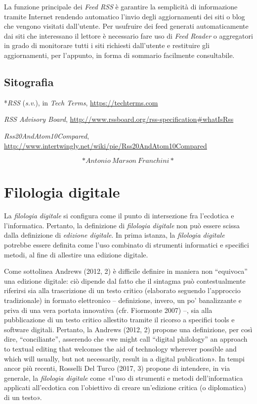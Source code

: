 \documentclass[
  b5paper,
  twoside,
  12pt,
  chapterprefix=false,
  bibliography=totocnumbered,
  parskip=false]{scrbook}
\begin{document}
La funzione principale dei \emph{Feed RSS} è garantire la semplicità di
informazione tramite Internet rendendo automatico l'invio degli
aggiornamenti dei siti o blog che vengono visitati dall'utente. Per
usufruire dei feed generati automaticamente dai siti che interessano il
lettore è necessario fare uso di \emph{Feed Reader} o aggregatori in grado di
monitorare tutti i siti richiesti dall'utente e restituire gli
aggiornamenti, per l'appunto, in forma di sommario facilmente
consultabile.

\hypertarget{sitografia-11}{%
\section*{Sitografia}\label{sitografia-11}}

*\emph{RSS} (\emph{s.v}.), in \emph{Tech Terms},
\url{https://techterms.com}

\emph{RSS Advisory Board},
\url{http://www.rssboard.org/rss-specification\#whatIsRss}

\emph{Rss20AndAtom10Compared},
\url{http://www.intertwingly.net/wiki/pie/Rss20AndAtom10Compared}

\[*Antonio~Marson~Franchini*\]

\hypertarget{filologia-digitale}{%
\chapter{Filologia digitale}\label{filologia-digitale}}

La \emph{filologia} \emph{digitale} si configura come il punto di intersezione fra
l'ecdotica e l'informatica. Pertanto, la definizione di \emph{filologia
digitale} non può essere scissa dalla definizione di \emph{edizione
digitale}. In prima istanza, la \emph{filologia digitale} potrebbe essere
definita come l'uso combinato di strumenti informatici e specifici
metodi, al fine di allestire una edizione digitale.

Come sottolinea Andrews (2012, 2) è difficile definire in maniera non
\enquote{equivoca} una edizione digitale: ciò dipende dal fatto che il sintagma
può contestualmente riferirsi sia alla trascrizione di un testo critico
(elaborato seguendo l'approccio tradizionale) in formato elettronico --
definizione, invero, un po' banalizzante e priva di una vera portata
innovativa (cfr. Fiormonte 2007) --, sia alla pubblicazione di un testo
critico allestito tramite il ricorso a specifici tools e software
digitali. Pertanto, la Andrews (2012, 2) propone una definizione, per
così dire, \enquote{conciliante}, asserendo che «we might call \enquote{digital
philology} an approach to textual editing that welcomes the aid of
technology wherever possible and which will usually, but not
necessarily, result in a digital publication». In tempi ancor più
recenti, Rosselli Del Turco (2017, 3) propone di intendere, in via
generale, la \emph{filologia digitale} come «l'uso di strumenti e metodi
dell'informatica applicati all'ecdotica con l'obiettivo di creare
un'edizione critica (o diplomatica) di un testo».
\end{document}
